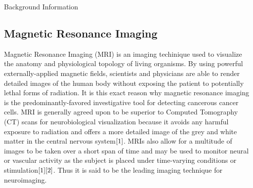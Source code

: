 \documentclass[a4paper,12pt]{article}
\begin{document}
\newpage
\doublespacing


\begin{section}{Background Information}








\subsection{Magnetic Resonance Imaging}
Magnetic Resonance Imaging (MRI) is an imaging techinique used to visualize the anatomy and physiological topology of living organisms. By using powerful externally-applied magnetic fields, scientists and physicians are able to render detailed images of the human body without exposing the patient to potentially lethal forms of radiation. It is this exact reason why magnetic resonance imaging is the predominantly-favored investigative tool for detecting cancerous cancer cells. MRI is generally agreed upon to be superior to Computed Tomography (CT) scans for neurobiological visualization because it avoids any harmful exposure to radiation and offers a more detailed image of the grey and white matter in the central nervous system$\cite{1}$.
MRIs also allow for a multitude of images to be taken over a short span of time and may be used to monitor neural or vascular activity as the subject is placed under time-varying conditions or stimulation$\cite{1}\cite{2}$.
Thus it is said to be the leading imaging technique for neuroimaging. \\


\end{section}
\end{document}
